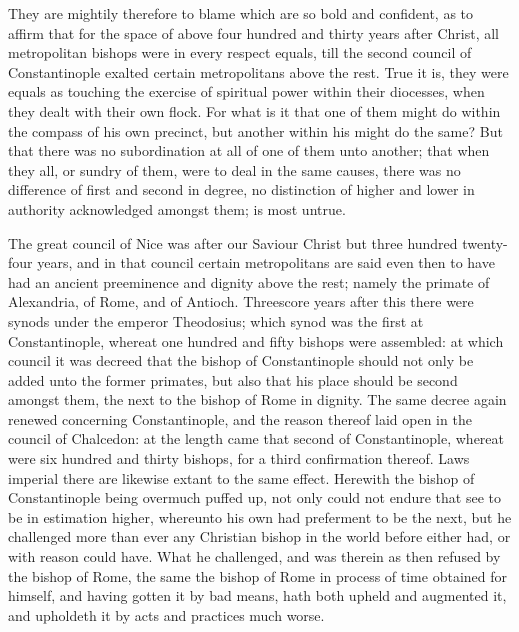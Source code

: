 They are mightily therefore to blame which are so bold and confident, as to affirm that for the space of above four hundred and thirty years after Christ, all metropolitan bishops were in every respect equals, till the second council of Constantinople  exalted certain metropolitans above the rest. True it is, they were equals as touching the exercise of spiritual power within their diocesses, when they dealt with their own flock. For what is it that one of them might do within the compass of his own precinct, but another within his might do the same? But that there was no subordination at all of one of them unto another; that when they all, or sundry of them, were to deal in the same causes, there was no difference of first and second in degree, no distinction of higher and lower in authority acknowledged amongst them; is most untrue.

The great council of Nice was after our Saviour Christ but three hundred twenty-four years, and in that council certain metropolitans are said even then to have had an ancient preeminence and dignity above the rest; namely the primate of Alexandria, of Rome, and of Antioch. Threescore years after this there were synods under the emperor Theodosius; which synod was the first at Constantinople, whereat one hundred and fifty bishops were assembled: at which council it was decreed that the bishop of Constantinople should not only be added unto the former primates, but also that his place should be second amongst them, the next to the bishop of Rome in dignity. The same decree again renewed concerning Constantinople, and the reason thereof laid open in the council of Chalcedon: at the length came that second  of Constantinople,
 whereat were six hundred and thirty bishops, for a third confirmation thereof. Laws imperial there are likewise extant to the same effect. Herewith the bishop of Constantinople being overmuch puffed up, not only could not endure that see to be in estimation higher, whereunto his own had preferment to be the next, but he challenged more than ever any Christian bishop in the world before either had, or with reason could have. What he challenged, and was therein as then refused by the bishop of Rome, the same the bishop of Rome in process of time obtained for himself, and having gotten it by bad means, hath both upheld and augmented it, and upholdeth it by acts and practices much worse.

